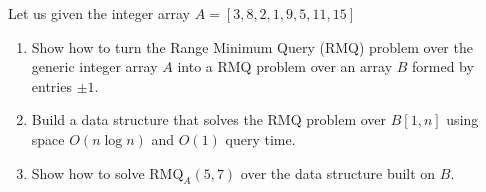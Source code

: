 \exercise

Let us given the integer array $A = [ 3, 8, 2, 1, 9, 5, 11, 15 ]$
%
\begin{enumerate}

  \item Show how to turn the Range Minimum Query (RMQ) problem over the generic
  integer array $A$ into a RMQ problem over an array $B$ formed by entries
  $\pm 1$.

  \item  Build a data structure that solves the RMQ problem over $B[1, n]$ using
  space $O(n \log n)$ and $O(1)$ query time.

  \item Show how to solve $\text{RMQ}_A(5, 7)$ over the data structure built on
  $B$.

\end{enumerate}

\solution

